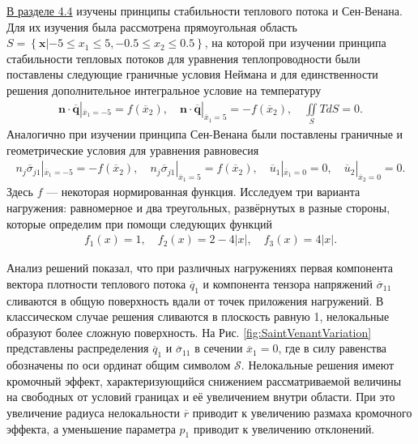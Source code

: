 \underline{В разделе 4.4} изучены принципы стабильности теплового потока и Сен-Венана. Для их изучения была рассмотрена прямоугольная область $S = \left\{ \boldsymbol{x} | -5 \leqslant x_1 \leqslant 5, -0.5 \leqslant x_2 \leqslant 0.5 \right\}$, на которой при изучении принципа стабильности тепловых потоков для уравнения теплопроводности были поставлены следующие граничные условия Неймана и для единственности решения дополнительное интегральное условие на температуру
\begin{gather*}
	\boldsymbol{n} \cdot \overline{\boldsymbol{q}} |_{\overline{x}_1 = -5} = f(\overline{x}_2),
	\quad
	\boldsymbol{n} \cdot \overline{\boldsymbol{q}} |_{\overline{x}_1 = 5} = -f(\overline{x}_2),
	\quad
	\iint\limits_S T dS = 0.
\end{gather*}
Аналогично при изучении принципа Сен-Венана были поставлены граничные и геометрические условия для уравнения равновесия
\begin{gather*}
	n_j \overline{\sigma}_{j1} |_{\overline{x}_1 = -5} = -f(\overline{x}_2),
	\quad
	n_j \overline{\sigma}_{j1} |_{\overline{x}_1 = 5} = f(\overline{x}_2),
	\quad
	\overline{u}_1 |_{\overline{x}_1 = 0} = 0,
	\quad
	\overline{u}_2 |_{\overline{x}_2 = 0} = 0.
\end{gather*}
Здесь $f$ --- некоторая нормированная функция. Исследуем три варианта нагружения: равномерное и два треугольных, развёрнутых в разные стороны, которые определим при помощи следующих функций
\begin{gather*}
	f_1 (x) = 1,
	\quad
	f_2 (x) = 2 - 4 |x|,
	\quad
	f_3 (x) = 4 |x|.
\end{gather*}

Анализ решений показал, что при различных нагружениях первая компонента вектора плотности теплового потока $\overline{q}_1$ и компонента тензора напряжений $\overline{\sigma}_{11}$ сливаются в общую поверхность вдали от точек приложения нагружений. В классическом случае решения сливаются в плоскость равную 1, нелокальные образуют более сложную поверхность. На Рис. \ref{fig:SaintVenantVariation} представлены распределения $\overline{q}_1$ и $\overline{\sigma}_{11}$ в сечении $\overline{x}_1 = 0$, где в силу равенства обозначены по оси ординат общим символом $\mathcal{S}$. Нелокальные решения имеют кромочный эффект, характеризующийся снижением рассматриваемой величины на свободных от условий границах и её увеличением внутри области. При это увеличение радиуса нелокальности $\overline{r}$ приводит к увеличению размаха кромочного эффекта, а уменьшение параметра $p_1$ приводит к увеличению отклонений.

